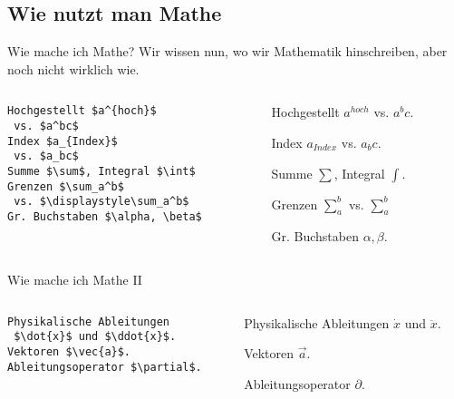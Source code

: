 \subsection{Wie nutzt man Mathe}

\begin{frame}[fragile]{Wie mache ich Mathe?}
Wir wissen nun, wo wir Mathematik hinschreiben, aber noch nicht wirklich wie.
\begin{columns}
\begin{column}{0.55\textwidth}
\begin{codeblock}
\begin{verbatim}
Hochgestellt $a^{hoch}$ 
 vs. $a^bc$
Index $a_{Index}$ 
 vs. $a_bc$
Summe $\sum$, Integral $\int$
Grenzen $\sum_a^b$ 
 vs. $\displaystyle\sum_a^b$
Gr. Buchstaben $\alpha, \beta$
\end{verbatim}
\end{codeblock}
\end{column}
\pause
\begin{column}{0.4\textwidth}
Hochgestellt $a^{hoch}$ vs. $a^bc$. 

\medskip\pause
Index $a_{Index}$ vs. $a_bc$.

\medskip\pause
Summe $\sum$, Integral $\int$.

\medskip\pause
Grenzen $\sum_a^b$ vs. $\displaystyle \sum_a^b$

\medskip\pause
Gr. Buchstaben $\alpha, \beta$.
\end{column}
\end{columns}
\end{frame}


\begin{frame}[fragile]{Wie mache ich Mathe II}
\begin{columns}
\begin{column}{0.55\textwidth}
\begin{codeblock}
\begin{verbatim}
Physikalische Ableitungen 
 $\dot{x}$ und $\ddot{x}$. 
Vektoren $\vec{a}$.
Ableitungsoperator $\partial$.
\end{verbatim}
\end{codeblock}
\end{column}
\pause
\begin{column}{0.4\textwidth}
Physikalische Ableitungen $\dot{x}$ und $\ddot{x}$. 

\medskip\pause
Vektoren $\vec{a}$.

\medskip\pause
Ableitungsoperator $\partial$.
\end{column}
\end{columns}
\end{frame}

